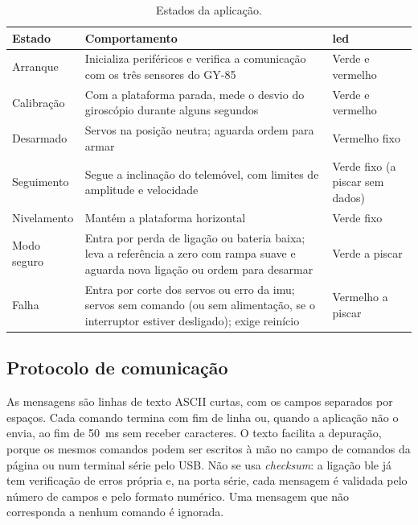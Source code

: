 \begin{table}[H]
\centering\small
\caption{Estados da aplicação.}
\begin{tabularx}{\textwidth}{>{\raggedright\arraybackslash}p{2.6cm}Yp{3.2cm}}
\toprule
Estado & Comportamento & \acrshort{led}\\\midrule
Arranque & Inicializa periféricos e verifica a comunicação com os três sensores do GY-85 & Verde e vermelho\\
Calibração & Com a plataforma parada, mede o desvio do giroscópio durante alguns segundos & Verde e vermelho\\
Desarmado & Servos na posição neutra; aguarda ordem para armar & Vermelho fixo\\
Seguimento & Segue a inclinação do telemóvel, com limites de amplitude e velocidade & Verde fixo (a piscar sem dados)\\
Nivelamento & Mantém a plataforma horizontal & Verde fixo\\
Modo seguro & Entra por perda de ligação ou bateria baixa; leva a referência a zero com rampa suave e aguarda nova ligação ou ordem para desarmar & Verde a piscar\\
Falha & Entra por corte dos servos ou erro da \acrshort{imu}; servos sem comando (ou sem alimentação, se o interruptor estiver desligado); exige reinício & Vermelho a piscar\\
\bottomrule
\end{tabularx}
\label{tab:estados}
\end{table}

\subsection{Protocolo de comunicação}
As mensagens são linhas de texto ASCII curtas, com os campos separados por espaços. Cada comando termina com fim de linha ou, quando a aplicação não o envia, ao fim de \SI{50}{\milli\second} sem receber caracteres. O texto facilita a depuração, porque os mesmos comandos podem ser escritos à mão no campo de comandos da página ou num terminal série pelo USB. Não se usa \textit{checksum}: a ligação \gls{ble} já tem verificação de erros própria e, na porta série, cada mensagem é validada pelo número de campos e pelo formato numérico. Uma mensagem que não corresponda a nenhum comando é ignorada.

